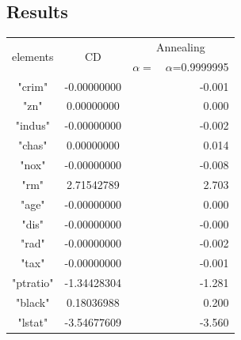 \documentclass[fp,twocolumn]{jpsj3}
\begin{document}
\subsection{Results}
\begin{table}
  \begin{tabular}{|c||c|r|r|} \hline
    \multirow{2}{*}{elements} & \multirow{2}{*}{CD} & \multicolumn{2}{c|}{Annealing} \\ \cline{3-4}
    & & \multicolumn{1}{c|}{$\alpha=$} & \multicolumn{1}{c|}{$\alpha$=0.9999995} \\ \hline
    "crim"    & -0.00000000 & & -0.001 \\
    "zn"      &  0.00000000 & &  0.000 \\
    "indus"   & -0.00000000 & & -0.002 \\
    "chas"    &  0.00000000 & &  0.014 \\
    "nox"     & -0.00000000 & & -0.008 \\
    "rm"      &  2.71542789 & &  2.703 \\
    "age"     & -0.00000000 & &  0.000 \\
    "dis"     & -0.00000000 & & -0.000 \\
    "rad"     & -0.00000000 & & -0.002 \\
    "tax"     & -0.00000000 & & -0.001 \\
    "ptratio" & -1.34428304 & & -1.281 \\
    "black"   &  0.18036988 & &  0.200 \\
    "lstat"   & -3.54677609 & & -3.560 \\ \hline
  \end{tabular}
\end{table}

\begin{acknowledgment}



\end{acknowledgment}

\end{document}
